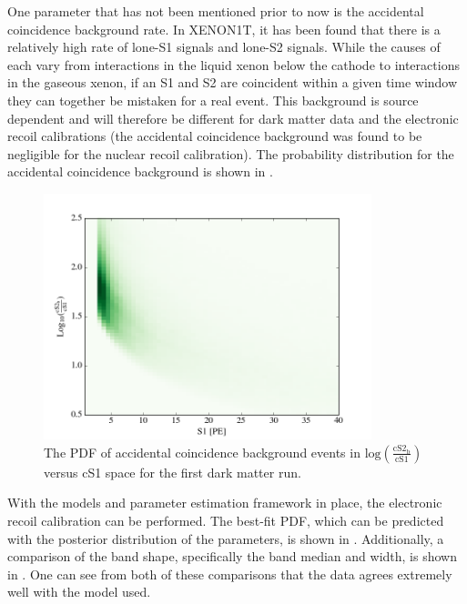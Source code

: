 One parameter that has not been mentioned prior to now is the accidental coincidence background rate.  In XENON1T, it has been found that there is a relatively high rate of lone-S1 signals and lone-S2 signals.  While the causes of each vary from interactions in the liquid xenon below the cathode to interactions in the gaseous xenon, if an S1 and S2 are coincident within a given time window they can together be mistaken for a real event.  This background is source dependent and will therefore be different for dark matter data and the electronic recoil calibrations (the accidental coincidence background was found to be negligible for the nuclear recoil calibration).  The probability distribution for the accidental coincidence background is shown in .

\begin{figure}[t]
	\centering
	\includegraphics[width=0.85\textwidth]{xe1t_ac_bkg}
	\caption{The PDF of accidental coincidence background events in $\textrm{log} \left( \frac{\textrm{cS2}_{\textrm{b}}}{\textrm{cS1}} \right)$ versus cS1 space for the first dark matter run.}
	\label{fig:xe1t_ac_bkg}
\end{figure}



With the models and parameter estimation framework in place, the electronic recoil calibration can be performed.  The best-fit PDF, which can be predicted with the posterior distribution of the parameters, is shown in .  Additionally, a comparison of the band shape, specifically the band median and width, is shown in .  One can see from both of these comparisons that the  data agrees extremely well with the model used.


